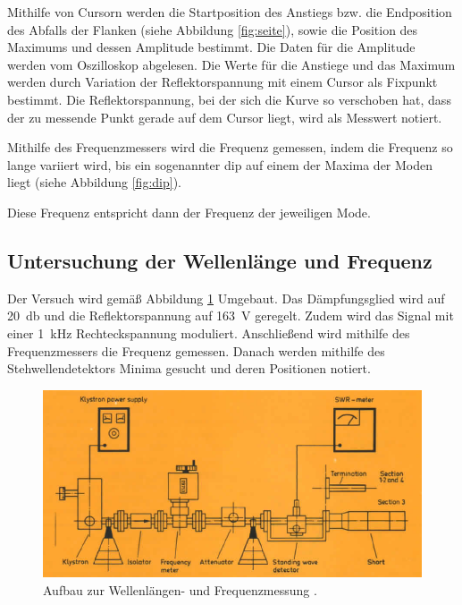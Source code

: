 Mithilfe von Cursorn werden die Startposition des Anstiegs bzw. die Endposition
des Abfalls der Flanken (siehe Abbildung \ref{fig:seite}), sowie die Position des
Maximums und dessen Amplitude bestimmt. Die Daten für die Amplitude werden vom
Oszilloskop abgelesen. Die Werte für die Anstiege und das Maximum werden durch
Variation der Reflektorspannung mit einem Cursor als Fixpunkt bestimmt. Die Reflektorspannung,
bei der sich die Kurve so verschoben hat, dass der zu messende Punkt gerade auf dem
Cursor liegt, wird als Messwert notiert.


Mithilfe des Frequenzmessers wird die Frequenz gemessen, indem die Frequenz so lange variiert wird, bis ein
sogenannter dip auf einem der Maxima der Moden liegt (siehe Abbildung \ref{fig:dip}).


Diese Frequenz entspricht dann der Frequenz der jeweiligen Mode.

\subsection{Untersuchung der Wellenlänge und Frequenz}
\label{subsec:frequenz}
Der Versuch wird gemäß Abbildung \ref{fig:aufbau_frequenz} Umgebaut. Das Dämpfungsglied
wird auf \SI{20}{\decibel} und die Reflektorspannung auf \SI{163}{\volt} geregelt. Zudem wird das
Signal mit einer \SI{1}{\kilo\hertz} Rechteckspannung moduliert. Anschließend wird
mithilfe des Frequenzmessers die Frequenz gemessen. Danach werden mithilfe des
Stehwellendetektors Minima gesucht und deren Positionen notiert.

\begin{figure}
  \centering
  \includegraphics[width=\textwidth]{data/aufbau_frequenz.png}
  \caption{Aufbau zur Wellenlängen- und Frequenzmessung \cite{Versuchsanleitung_alt}.}
  \label{fig:aufbau_frequenz}
\end{figure}

